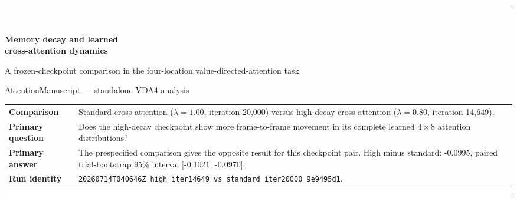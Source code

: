\documentclass[11pt]{article}
\begin{document}
\begin{titlepage}
\thispagestyle{empty}
\vspace*{16mm}
{\color{VdaBlue}\rule{\textwidth}{2.2pt}}\\[10mm]
{\fontsize{27}{32}\selectfont\bfseries Memory decay and learned\\ cross-attention dynamics\par}
\vspace{4mm}
{\fontsize{16}{21}\selectfont A frozen-checkpoint comparison in the four-location value-directed-attention task\par}
\vspace{15mm}
{\large AttentionManuscript --- standalone VDA4 analysis\par}
\vfill
\begin{tabularx}{\textwidth}{@{}p{3.4cm}Y@{}}
\toprule
\textbf{Comparison} & Standard cross-attention ($\lambda=1.00$, iteration 20,000) versus high-decay cross-attention ($\lambda=0.80$, iteration 14,649).\\
\textbf{Primary question} & Does the high-decay checkpoint show more frame-to-frame movement in its complete learned $4\times8$ attention distributions?\\
\textbf{Primary answer} & The prespecified comparison gives the opposite result for this checkpoint pair. High minus standard: -0.0995, paired trial-bootstrap 95\% interval [-0.1021, -0.0970].\\
\textbf{Run identity} & \texttt{20260714T040646Z\_high\_iter14649\_vs\_standard\_iter20000\_9e9495d1}.\\
\bottomrule
\end{tabularx}
\vfill
{\color{VdaBlue}\rule{\textwidth}{2.2pt}}
\end{titlepage}

\begin{abstract}
This analysis tests a precise hypothesis about recurrent visual attention: whether a stronger memory decay is associated with more dynamic learned attention maps. Two preserved VDA4 cross-attention checkpoints were evaluated on identical valid and deliberately forced-invalid videos. ``Activity'' was fixed in advance as frame-to-frame total variation over every query-to-key attention distribution, because total softmax mass is constant by construction. The standard checkpoint averaged 0.5245; the high-decay checkpoint averaged 0.4249. The paired high-minus-standard difference was -0.0995 (95\% trial-bootstrap interval [-0.1021, -0.0970]; $n=256$ event trials). Thus the high-decay checkpoint was less, not more, dynamic under the primary metric. Behavioral curves, image-versus-memory allocation, selectivity, spatial reorientation, response-stratified traces, and raw query-level maps provide convergent description. The comparison remains associational: the high-decay checkpoint was frozen 5,351 iterations earlier, and only one training seed exists per condition.
\end{abstract}
\end{document}
